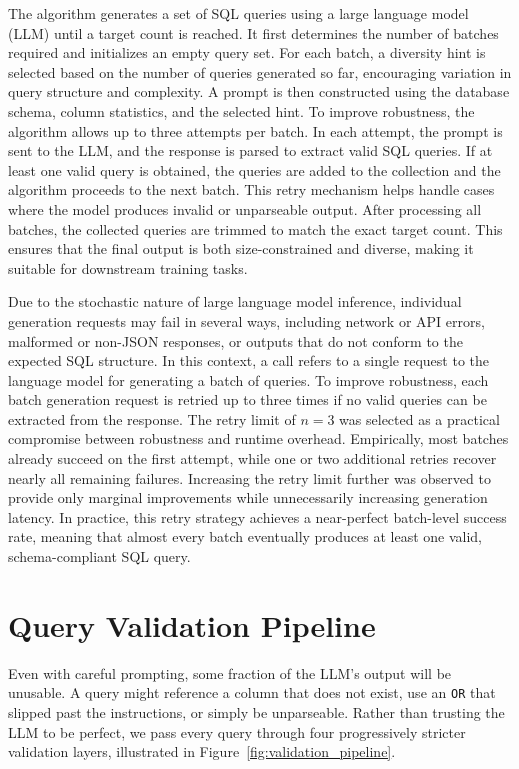 The algorithm generates a set of SQL queries using a large language model (LLM) until a target count is reached. It first determines the number of batches required and initializes an empty query set. For each batch, a diversity hint is selected based on the number of queries generated so far, encouraging variation in query structure and complexity. A prompt is then constructed using the database schema, column statistics, and the selected hint. To improve robustness, the algorithm allows up to three attempts per batch. In each attempt, the prompt is sent to the LLM, and the response is parsed to extract valid SQL queries. If at least one valid query is obtained, the queries are added to the collection and the algorithm proceeds to the next batch. This retry mechanism helps handle cases where the model produces invalid or unparseable output. After processing all batches, the collected queries are trimmed to match the exact target count. This ensures that the final output is both size-constrained and diverse, making it suitable for downstream training tasks.

Due to the stochastic nature of large language model inference, individual generation requests may fail in several ways, including network or API errors, malformed or non-JSON responses, or outputs that do not conform to the expected SQL structure. In this context, a call refers to a single request to the language model for generating a batch of queries. To improve robustness, each batch generation request is retried up to three times if no valid queries can be extracted from the response. The retry limit of $n=3$ was selected as a practical compromise between robustness and runtime overhead. Empirically, most batches already succeed on the first attempt, while one or two additional retries recover nearly all remaining failures. Increasing the retry limit further was observed to provide only marginal improvements while unnecessarily increasing generation latency. In practice, this retry strategy achieves a near-perfect batch-level success rate, meaning that almost every batch eventually produces at least one valid, schema-compliant SQL query.


\section{Query Validation Pipeline}

Even with careful prompting, some fraction of the LLM's output will be unusable. A query might reference a column that does not exist, use an \texttt{OR} that slipped past the instructions, or simply be unparseable. Rather than trusting the LLM to be perfect, we pass every query through four progressively stricter validation layers, illustrated in Figure~\ref{fig:validation_pipeline}.

